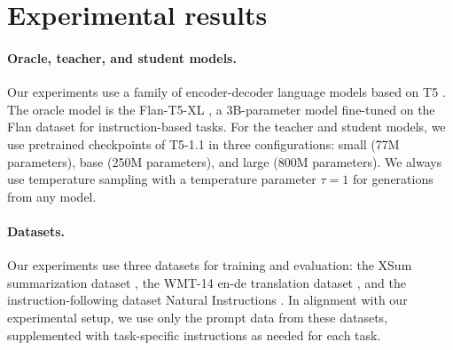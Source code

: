 \section{Experimental results}\label{sec:results}



\paragraph{Oracle, teacher, and student models.} Our experiments use a family of encoder-decoder language models based on T5 \cite{raffel2020exploring,roberts2022t5x}. The oracle model is the Flan-T5-XL \cite{chung2024scaling}, a 3B-parameter model fine-tuned on the Flan dataset \cite{wei2021finetuned,longpre2023flan} for instruction-based tasks. For the teacher and student models, we use pretrained checkpoints of T5-1.1 in three configurations: small (77M parameters), base (250M parameters), and large (800M parameters). We always use temperature sampling with a temperature parameter $\tau = 1$ for generations from any model.

\paragraph{Datasets.} Our experiments use three datasets for training and evaluation: the XSum summarization dataset \cite{narayan2018dont}, the WMT-14 en-de translation dataset \cite{bojar2014findings}, and the instruction-following dataset Natural Instructions \cite{naturalinstructions,supernaturalinstructions}. In alignment with our experimental setup, we use only the prompt data from these datasets, supplemented with task-specific instructions as needed for each task.

